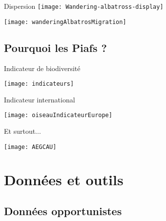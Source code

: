 \documentclass[10pt]{beamer}
\begin{document}
\begin{frame}{Dispersion}
    \texttt{[image: Wandering-albatross-display]} 

    \begin{center}
      \texttt{[image: wanderingAlbatrosMigration]} 
  \end{center}
\end{frame}


\subsection{Pourquoi les Piafs ?} 

\begin{frame}{Indicateur de biodiversité}
  \begin{center}
    \texttt{[image: indicateurs]} 
  \end{center}
\end{frame}

\begin{frame}{Indicateur international}
  \begin{center}
    \texttt{[image: oiseauIndicateurEurope]} 
  \end{center}
\end{frame}

\begin{frame}{Et surtout...}
  \begin{center}
    \texttt{[image: AEGCAU]} 
  \end{center}
\end{frame}

\section{Données et outils}




\subsection{Données opportunistes} 
\end{document}
